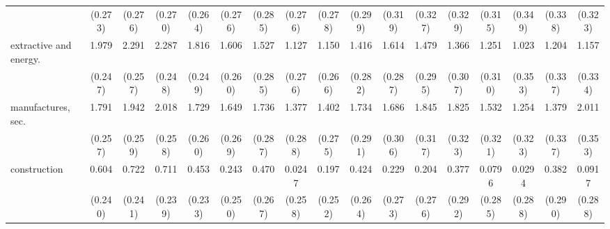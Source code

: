 {\begin{tabular}{l*{16}{c}}
                    &     (0.273)         &     (0.276)         &     (0.270)         &     (0.264)         &     (0.276)         &     (0.285)         &     (0.276)         &     (0.278)         &     (0.299)         &     (0.319)         &     (0.327)         &     (0.329)         &     (0.315)         &     (0.349)         &     (0.338)         &     (0.323)         \\
[1em]
extractive and energy.&       1.979\sym{***}&       2.291\sym{***}&       2.287\sym{***}&       1.816\sym{***}&       1.606\sym{***}&       1.527\sym{***}&       1.127\sym{***}&       1.150\sym{***}&       1.416\sym{***}&       1.614\sym{***}&       1.479\sym{***}&       1.366\sym{***}&       1.251\sym{***}&       1.023\sym{**} &       1.204\sym{***}&       1.157\sym{***}\\
                    &     (0.247)         &     (0.257)         &     (0.248)         &     (0.249)         &     (0.260)         &     (0.285)         &     (0.276)         &     (0.266)         &     (0.282)         &     (0.287)         &     (0.295)         &     (0.307)         &     (0.310)         &     (0.353)         &     (0.337)         &     (0.334)         \\
[1em]
manufactures, sec.  &       1.791\sym{***}&       1.942\sym{***}&       2.018\sym{***}&       1.729\sym{***}&       1.649\sym{***}&       1.736\sym{***}&       1.377\sym{***}&       1.402\sym{***}&       1.734\sym{***}&       1.686\sym{***}&       1.845\sym{***}&       1.825\sym{***}&       1.532\sym{***}&       1.254\sym{***}&       1.379\sym{***}&       2.011\sym{***}\\
                    &     (0.257)         &     (0.259)         &     (0.258)         &     (0.260)         &     (0.269)         &     (0.287)         &     (0.288)         &     (0.275)         &     (0.291)         &     (0.306)         &     (0.317)         &     (0.323)         &     (0.321)         &     (0.323)         &     (0.337)         &     (0.353)         \\
[1em]
construction        &       0.604\sym{*}  &       0.722\sym{**} &       0.711\sym{**} &       0.453         &       0.243         &       0.470         &      0.0247         &       0.197         &       0.424         &       0.229         &       0.204         &       0.377         &      0.0796         &      0.0294         &       0.382         &      0.0917         \\
                    &     (0.240)         &     (0.241)         &     (0.239)         &     (0.233)         &     (0.250)         &     (0.267)         &     (0.258)         &     (0.252)         &     (0.264)         &     (0.273)         &     (0.276)         &     (0.292)         &     (0.285)         &     (0.288)         &     (0.290)         &     (0.288)         \\

\end{tabular}}
